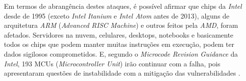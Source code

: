\documentclass[
	article,			    %
	12pt,				    %
	oneside,			    %
	a4paper,			    %
	chapter=TITLE,		    %
	section=TITLE,		    %
	subsection=TITLE,	    %
	english,			    %
	brazil,				    %
	sumario=tradicional
]{abntex2}
\begin{document}
Em termos de abrangência destes ataques, é possível afirmar que chips da \emph{Intel} desde de 1995 (exceto \emph{Intel Itanium} e \emph{Intel Atom} antes de 2013), alguns de arquitetura \emph{ARM} (\emph{Advanced RISC Machine}) e outros feitos pela \emph{AMD}, foram afetados. Servidores na nuvem, celulares, desktops, notebooks e basicamente todos os chips que podem manter muitas instruções em execução, podem ter dados sigilosos comprometidos. E, segundo o \emph{Microcode Revision Guidance} da \emph{Intel}, 193 MCUs (\emph{Microcontroller Unit}) irão continuar com a falha, pois apresentaram questões de instabilidade com a mitigação das vulnerabilidades \cite{intel-mug}.
\end{document}

